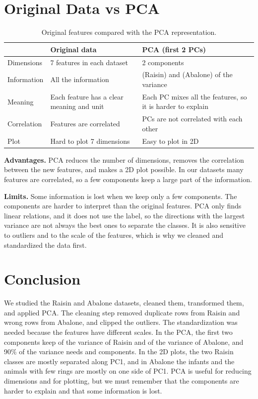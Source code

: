 \documentclass[11pt,a4paper]{article}
\begin{document}
\section{Original Data vs PCA}
\begin{table}[!htbp]
\centering
\small
\caption{Original features compared with the PCA representation.}
\label{tab:compare}
\begin{tabular}{p{3cm}p{5.5cm}p{5.5cm}}
\toprule
 & Original data & PCA (first 2 PCs) \\
\midrule
Dimensions & 7 features in each dataset & 2 components \\
Information & All the information & \RaisinCumTwo{} (Raisin) and \AbaloneCumTwo{} (Abalone) of the variance \\
Meaning & Each feature has a clear meaning and unit & Each PC mixes all the features, so it is harder to explain \\
Correlation & Features are correlated & PCs are not correlated with each other \\
Plot & Hard to plot 7 dimensions & Easy to plot in 2D \\
\bottomrule
\end{tabular}
\end{table}

\textbf{Advantages.} PCA reduces the number of dimensions, removes the correlation between the new features, and makes a 2D plot possible. In our datasets many features are correlated, so a few components keep a large part of the information.

\textbf{Limits.} Some information is lost when we keep only a few components. The components are harder to interpret than the original features. PCA only finds linear relations, and it does not use the label, so the directions with the largest variance are not always the best ones to separate the classes. It is also sensitive to outliers and to the scale of the features, which is why we cleaned and standardized the data first.

\section{Conclusion}
We studied the Raisin and Abalone datasets, cleaned them, transformed them, and applied PCA. The cleaning step removed \RaisinDupRows{} duplicate rows from Raisin and \AbaloneInvalidRows{} wrong rows from Abalone, and clipped the outliers. The standardization was needed because the features have different scales. In the PCA, the first two components keep \RaisinCumTwo{} of the variance of Raisin and \AbaloneCumTwo{} of the variance of Abalone, and 90\% of the variance needs \RaisinKNinety{} and \AbaloneKNinety{} components. In the 2D plots, the two Raisin classes are mostly separated along PC1, and in Abalone the infants and the animals with few rings are mostly on one side of PC1. PCA is useful for reducing dimensions and for plotting, but we must remember that the components are harder to explain and that some information is lost.
\end{document}
